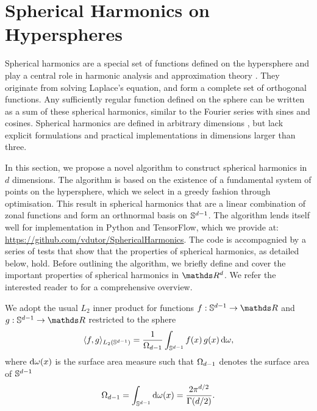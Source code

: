 \chapter{Spherical Harmonics on Hyperspheres} 
\label{appendix:spherical-harmonics}

Spherical harmonics are a special set of functions defined on the hypersphere and play a central role in harmonic analysis and approximation theory \citep{wendland2005}. They originate from solving Laplace's equation, and form a complete set of orthogonal functions. Any sufficiently regular function defined on the sphere can be written as a sum of these spherical harmonics, similar to the Fourier series with sines and cosines. Spherical harmonics are defined in arbitrary dimensions \citep{frye2014,dai2013}, but lack explicit formulations and practical implementations in dimensions larger than three. %

In this section, we propose a novel algorithm to construct spherical harmonics in $d$ dimensions. The algorithm is based on the existence of a fundamental system of points on the hypersphere, which we select in a greedy fashion through optimisation. This result in spherical harmonics that are a linear combination of zonal functions and form an orthnormal basis on $\mathbb{S}^{d-1}$. The algorithm lends itself well for implementation in Python and TensorFlow, which we provide at: \url{https://github.com/vdutor/SphericalHarmonics}. The code is accompagnied by a series of tests that show that the properties of spherical harmonics, as detailed below, hold. Before outlining the algorithm, we briefly define and cover the important properties of spherical harmonics in $\Reals^d$. We refer the interested reader to \citet{dai2013,frye2014} for a comprehensive overview.

We adopt the usual $L_2$ inner product for functions $f: \dsphere \rightarrow \Reals$ and $g: \dsphere \rightarrow \Reals$ restricted to the sphere 
\begin{equation}
     \langle f, g\rangle_{L_{2}(\mathbb{S}^{d-1})} = \frac{1}{\Omega_{d-1}} \int_{\mathbb{S}^{d-1}} f(x)\,g(x) \, \mathrm{d}{\omega},
\end{equation}
where $\mathrm{d}{\omega(x)}$ is the surface area measure such that $\Omega_{d-1}$ denotes the surface area of $\mathbb{S}^{d-1}$ 
\begin{equation}
\label{eq:surface}
    \Omega_{d-1} = \int_{\mathbb{S}^{d-1}} \mathrm{d}{\omega(x)} = \frac{2 \pi ^ {d/2}}{\Gamma(d/2)}.
\end{equation}

